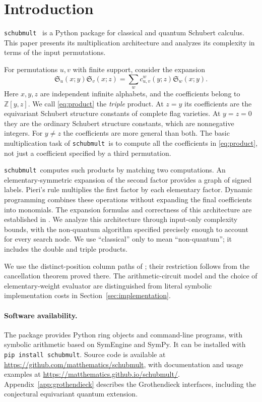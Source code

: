 \documentclass{amsart}
\theoremstyle{definition}
\theoremstyle{remark}
\numberwithin{equation}{section}
\newcommand{\Sch}{\mathfrak S}
\newcommand{\alg}{\texttt{schubmult}}
\begin{document}
\section{Introduction}

\alg\ \cite{schubmult} is a Python package for classical and quantum
Schubert calculus. This paper presents its multiplication architecture
and analyzes its complexity in terms of the input permutations.

For permutations $u,v$ with finite support, consider the expansion
\begin{equation}\label{eq:product}
 \Sch_u(x;y)\Sch_v(x;z)
   =\sum_w c_{u,v}^w(y;z)\Sch_w(x;y).
\end{equation}
Here $x,y,z$ are independent infinite alphabets, and the coefficients belong
to $\mathbb Z[y,z]$.
We call \eqref{eq:product} the \emph{triple} product.
At $z=y$ its coefficients are the equivariant Schubert structure
constants of complete flag varieties.
At $y=z=0$ they are the ordinary Schubert structure constants, which
are nonnegative integers.
For $y\ne z$ the coefficients are more general than both.
The basic multiplication task of \alg\ is to compute all the coefficients in
\eqref{eq:product}, not just a coefficient specified by a third permutation.

\alg\ computes such products by matching two
computations. An elementary-symmetric expansion of the second factor
provides a graph of signed labels. Pieri's rule multiplies the first factor
by each elementary factor. Dynamic programming combines these operations
without expanding the final coefficients into monomials.
The expansion formulas and correctness of this architecture are established
in \cite[Section~4 and Section~7]{samuelquantum}.
We analyze this architecture through input-only complexity bounds,
with the non-quantum algorithm specified precisely enough to account
for every search node.
We use ``classical'' only to mean ``non-quantum''; it includes the
double and triple products.

We use the distinct-position column paths of
\cite[Definition~4.4 and Theorem~4.5]{samuelquantum};
their restriction follows from the cancellation theorem proved there.
The arithmetic-circuit model and the choice of elementary-weight evaluator
are distinguished from literal symbolic implementation costs in
Section~\ref{sec:implementation}.

\paragraph{Software availability.}
The package provides Python ring objects and command-line programs,
with symbolic arithmetic based on SymEngine and SymPy.
It can be installed with \texttt{pip install schubmult}.
Source code is available at
\url{https://github.com/matthematics/schubmult},
with documentation and usage examples at
\url{https://matthematics.github.io/schubmult/}.
Appendix~\ref{app:grothendieck} describes the Grothendieck interfaces,
including the conjectural equivariant quantum extension.
\end{document}

